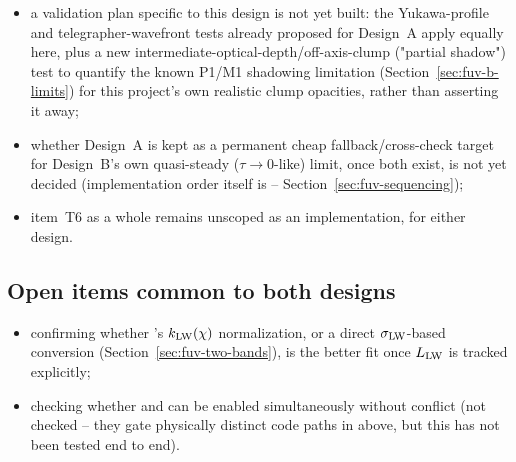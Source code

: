 \begin{itemize}
    refinement, not yet applied;
  \item a validation plan specific to this design is not yet built:
    the Yukawa-profile and telegrapher-wavefront tests already proposed
    for Design~A apply equally here, plus a new
    intermediate-optical-depth/off-axis-clump ("partial shadow") test
    to quantify the known P1/M1 shadowing limitation
    (Section~\ref{sec:fuv-b-limits}) for this project's own realistic
    clump opacities, rather than asserting it away;
  \item whether Design~A is kept as a permanent cheap fallback/cross-check
    target for Design~B's own quasi-steady ($\tau\to0$-like) limit, once
    both exist, is not yet decided (implementation order itself is --
    Section~\ref{sec:fuv-sequencing});
  \item item~T6 as a whole remains unscoped as an implementation, for
    either design.
\end{itemize}

\subsection{Open items common to both designs}
\label{sec:fuv-open-common}

\begin{itemize}
  \item confirming whether \citet{DraineBertoldi1996}'s $k_{\rm
    LW}(\chi)$ normalization, or a direct $\sigma_{\rm LW}$-based
    conversion (Section~\ref{sec:fuv-two-bands}), is the better fit
    once $L_{\rm LW}$ is tracked explicitly;
  \item checking whether  and
     can be enabled simultaneously
    without conflict (not checked -- they gate physically distinct
    code paths in  above, but this has not
    been tested end to end).
\end{itemize}
